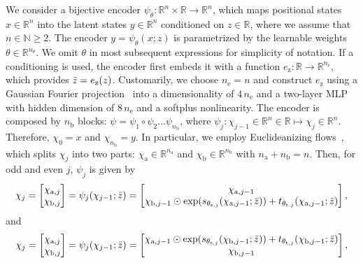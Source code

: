 We consider a bijective encoder $\psi_\theta : \mathbb{R}^n \times \mathbb{R} \to \mathbb{R}^n$, which maps positional states $x \in \mathbb{R}^n$ into the latent states $y \in \mathbb{R}^n$ conditioned on $z \in \mathbb{R}$, where we assume that $n \in \mathbb{N} \geq 2$.
The encoder $y = \psi_\theta(x;z)$ is parametrized by the learnable weights $\theta \in \mathbb{R}^{n_\theta}$. We omit $\theta$ in most subsequent expressions for simplicity of notation.
%
If a conditioning is used, the encoder first embeds it with a function $e_\mathrm{z}: \mathbb{R} \to \mathbb{R}^{n_\mathrm{e}}$, which provides $\Bar{z} = e_\mathrm{z}(z)$. Customarily, we choose $n_\mathrm{e} = n$ and construct $e_\mathrm{z}$ using a Gaussian Fourier projection~\citep{chi2023diffusion} into a dimensionality of $4 \, n_\mathrm{e}$ and a two-layer MLP with hidden dimension of $8 \, n_\mathrm{e}$ and a softplus nonlinearity.
%
The encoder is composed by $n_\mathrm{b}$ blocks: $\psi = \psi_1 \circ \psi_2 \dots \psi_{n_\mathrm{b}}$, where $\psi_j: \chi_{j-1} \in \mathbb{R}^n \in \mathbb{R} \mapsto \chi_{j} \in \mathbb{R}^n$. Therefore, $\chi_0 = x$ and $\chi_{n_\mathrm{b}} = y$.
In particular, we employ Euclideanizing flows~\citep{dinh2017density, rana2020euclideanizing}, which splits $\chi_j$ into two parts: $\chi_\mathrm{a} \in \mathbb{R}^{n_\mathrm{a}}$ and $\chi_\mathrm{b} \in \mathbb{R}^{n_\mathrm{b}}$ with $n_\mathrm{a} + n_\mathrm{b} = n$.
%
Then, for odd and even $j$, $\psi_j$ is given by
\begin{equation}
    \chi_j = \begin{bmatrix}
        \chi_{\mathrm{a}, j}\\
        \chi_{\mathrm{b}, j}
    \end{bmatrix} = \psi_j(\chi_{j-1}; \Bar{z}) = \begin{bmatrix}
        \chi_{\mathrm{a}, j-1}\\
        \chi_{\mathrm{b}, j-1} \odot \exp(s_{\theta_{\mathrm{s},j}}(\chi_{\mathrm{a}, j-1}; \Bar{z})) + t_{\theta_{\mathrm{t},j}}(\chi_{\mathrm{a}, j-1}; \Bar{z})
    \end{bmatrix},
\end{equation}
and
\begin{equation}
    \chi_j = \begin{bmatrix}
        \chi_{\mathrm{a}, j}\\
        \chi_{\mathrm{b}, j}
    \end{bmatrix} = \psi_j(\chi_{j-1}; \Bar{z}) = \begin{bmatrix}
        \chi_{\mathrm{a}, j-1} \odot \exp(s_{\theta_{\mathrm{s},j}}(\chi_{\mathrm{b}, j-1}; \Bar{z})) + t_{\theta_{\mathrm{t},j}}(\chi_{\mathrm{b}, j-1}; \Bar{z})\\
        \chi_{\mathrm{b}, j-1}
    \end{bmatrix},
\end{equation}
